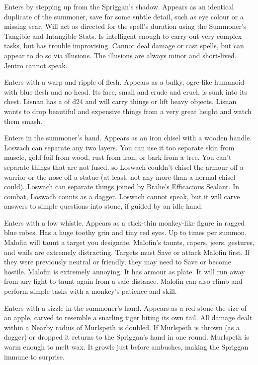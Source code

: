 {
Enters by stepping up from the Spriggan's shadow. Appears as an identical duplicate of the summoner, save for some subtle detail, such as eye colour or a missing scar. Will act as directed for the spell's duration using the Summoner's Tangible and Intangible Stats.  Is intelligent enough to carry out very complex tasks, but has trouble improvising. Cannot deal damage or cast spells, but can appear to do so via illusions. The illusions are always minor and short-lived.  Jentro cannot speak.


Enters with a warp and ripple of flesh. Appears as a bulky, ogre-like humanoid with blue flesh and no head. Its face, small and crude and cruel, is sunk into its chest. Lisnan has a \VIG of d24 and will carry things or lift heavy objects. Lisnan wants to drop beautiful and expensive things from a very great height and watch them smash.


Enters in the summoner's hand. Appears as an iron chisel with a wooden handle. Loswach can separate any two layers. You can use it too separate skin from muscle, gold foil from wood, rust from iron, or bark from a tree. You can't separate things that are not fused, so Loswach couldn't chisel the armour off a warrior or the nose off a statue (at least, not any more than a normal chisel could). Loswach can separate things joined by Brahe's Efficacious Sealant.  In combat, Loswach counts as a dagger. Loswach cannot speak, but it will carve answers to simple questions into stone, if guided by an idle hand.



Enters with a low whistle. Appears as a stick-thin monkey-like figure in ragged blue robes. Has a huge toothy grin and tiny red eyes. Up to \DICE times per summon, Malofin will taunt a target you designate. Malofin's taunts, capers, jeers, gestures, and wails are extremely distracting. Targets must Save or attack Malofin first. If they were previously neutral or friendly, they may need to Save or become hostile. Malofin is extremely annoying. It has armour as plate. It will run away from any fight to taunt again from a safe distance. Malofin can also climb and perform simple tasks with a monkey's patience and skill.

Enters with a sizzle in the summoner's hand. Appears as a red stone the size of an apple, carved to resemble a snarling tiger biting its own tail. All damage dealt within a Nearby radius of Murlspeth is doubled. If Murlspeth is thrown (as a dagger) or dropped it returns to the Spriggan's hand in one round. Murlspeth is warm enough to melt wax. It growls just before ambushes, making the Spriggan immune to surprise.


}
